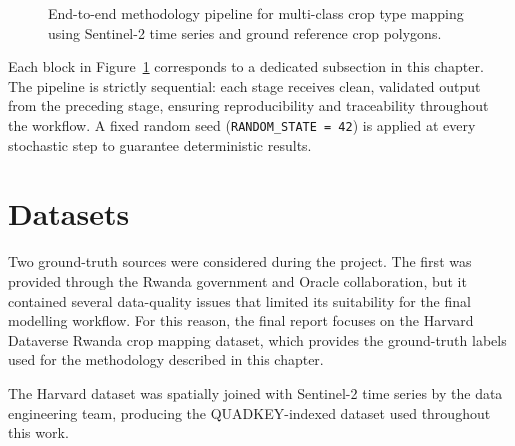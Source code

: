 \begin{figure}[H]
{
}
\caption{End-to-end methodology pipeline for multi-class crop type mapping using Sentinel-2 time series and ground reference crop polygons.}
\label{fig:pipeline}
\end{figure}

Each block in Figure~\ref{fig:pipeline} corresponds to a dedicated subsection
in this chapter. The pipeline is strictly sequential: each stage receives
clean, validated output from the preceding stage, ensuring reproducibility and
traceability throughout the workflow. A fixed random seed (\texttt{RANDOM\_STATE~=~42})
is applied at every stochastic step to guarantee deterministic results.


\section{Datasets}
\label{sec:datasets}

Two ground-truth sources were considered during the project. The first was
provided through the Rwanda government and Oracle collaboration, but it
contained several data-quality issues that limited its suitability for the
final modelling workflow. For this reason, the final report
focuses on the Harvard Dataverse Rwanda crop mapping dataset, which provides
the ground-truth labels used for the methodology described in this chapter.

The Harvard dataset was spatially joined with Sentinel-2 time series by the
data engineering team, producing the QUADKEY-indexed dataset used throughout
this work.


